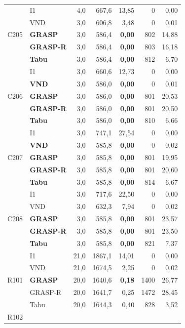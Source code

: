{\begin{longtable}{llrrrrr}
\midrule
\multirow{5}{*}{C205}
  & I1 & 4,0 & 667,6 & 13,85 & 0 & 0,00 \\
  & VND & 3,0 & 606,8 & 3,48 & 0 & 0,01 \\
  & \textbf{GRASP} & 3,0 & 586,4 & \textbf{0,00} & 802 & 14,88 \\
  & \textbf{GRASP-R} & 3,0 & 586,4 & \textbf{0,00} & 803 & 16,18 \\
  & \textbf{Tabu} & 3,0 & 586,4 & \textbf{0,00} & 812 & 6,70 \\
\midrule
\multirow{5}{*}{C206}
  & I1 & 3,0 & 660,6 & 12,73 & 0 & 0,00 \\
  & \textbf{VND} & 3,0 & 586,0 & \textbf{0,00} & 0 & 0,01 \\
  & \textbf{GRASP} & 3,0 & 586,0 & \textbf{0,00} & 801 & 20,53 \\
  & \textbf{GRASP-R} & 3,0 & 586,0 & \textbf{0,00} & 801 & 20,50 \\
  & \textbf{Tabu} & 3,0 & 586,0 & \textbf{0,00} & 810 & 6,66 \\
\midrule
\multirow{5}{*}{C207}
  & I1 & 3,0 & 747,1 & 27,54 & 0 & 0,00 \\
  & \textbf{VND} & 3,0 & 585,8 & \textbf{0,00} & 0 & 0,02 \\
  & \textbf{GRASP} & 3,0 & 585,8 & \textbf{0,00} & 801 & 19,95 \\
  & \textbf{GRASP-R} & 3,0 & 585,8 & \textbf{0,00} & 801 & 20,60 \\
  & \textbf{Tabu} & 3,0 & 585,8 & \textbf{0,00} & 814 & 6,67 \\
\midrule
\multirow{5}{*}{C208}
  & I1 & 3,0 & 717,6 & 22,50 & 0 & 0,00 \\
  & VND & 3,0 & 632,3 & 7,94 & 0 & 0,02 \\
  & \textbf{GRASP} & 3,0 & 585,8 & \textbf{0,00} & 801 & 23,57 \\
  & \textbf{GRASP-R} & 3,0 & 585,8 & \textbf{0,00} & 801 & 23,50 \\
  & \textbf{Tabu} & 3,0 & 585,8 & \textbf{0,00} & 821 & 7,37 \\
\midrule
\multirow{5}{*}{R101}
  & I1 & 21,0 & 1867,1 & 14,01 & 0 & 0,00 \\
  & VND & 21,0 & 1674,5 & 2,25 & 0 & 0,02 \\
  & \textbf{GRASP} & 20,0 & 1640,6 & \textbf{0,18} & 1400 & 26,77 \\
  & GRASP-R & 20,0 & 1641,7 & 0,25 & 1472 & 28,45 \\
  & Tabu & 20,0 & 1644,3 & 0,40 & 828 & 3,52 \\
\midrule
\multirow{5}{*}{R102}

\end{longtable}}
